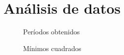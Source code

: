 \section{Análisis de datos}

\begin{figure}[H]
    \centering
    
    \caption{Períodos obtenidos}
\end{figure}

\begin{figure}[H]
    \centering
    
    \caption{Mínimos cuadrados}
\end{figure}
